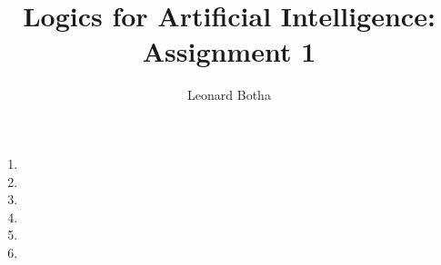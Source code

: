 \documentclass[12pt,a4paper]{article}
\title{{\bf Logics for Artificial Intelligence:}\\
Assignment 1}
\author{Leonard Botha}
\begin{document}
\maketitle
\begin{enumerate}
\item 
\item 
\item 
\item 
\item 
\item 
\end{enumerate}

\end{document}
